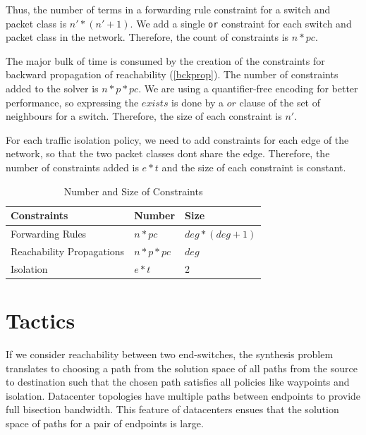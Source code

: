 \documentclass[]{sig}
\begin{document}
Thus, the number of terms in a forwarding rule constraint for a switch and packet class is $n'*(n'+1)$. We add a single \verb|or| constraint for each switch and packet class in the network. Therefore, the count of constraints is $n * pc$.

The major bulk of time is consumed by the creation of the constraints for backward propagation of reachability (\cref{bckprop}). The number of constraints added to the solver is $n * p * pc$. We are using a quantifier-free encoding for better performance, so expressing the $exists$ is done by a $or$ clause of the set of neighbours for a switch. Therefore, the size of each constraint is $n'$. 

For each traffic isolation policy, we need to add constraints for each edge of the network, so that the two packet classes dont share the edge. Therefore, the number of constraints added is $e * t$ and the size of each constraint is constant. 

\begin{table}[H]
\begin{center}
	\begin{tabular}{||m{6em} | m{7em} | m{7em} ||} 
		\hline
		Constraints & Number & Size \\ [0.5ex] 
		\hline\hline
		Forwarding Rules & $n*pc$ & $deg * (deg + 1)$ \\ [0.5ex] 
		\hline
		Reachability Propagations & $n*p*pc$ & $deg$ \\ [0.5ex] 
		\hline
		Isolation & $e * t$ & 2 \\
		\hline
	\end{tabular}
\end{center}
\caption{Number and Size of Constraints} \label{tab:title} 
\end{table}

\section{Tactics}
If we consider reachability between two end-switches, the synthesis problem translates to choosing a path from the solution space of all paths from the source to destination such that the chosen path satisfies all policies like waypoints and isolation. Datacenter topologies have multiple paths between endpoints to provide full bisection bandwidth. This feature of datacenters ensues that the solution space of paths for a pair of endpoints is large. 
\end{document}
